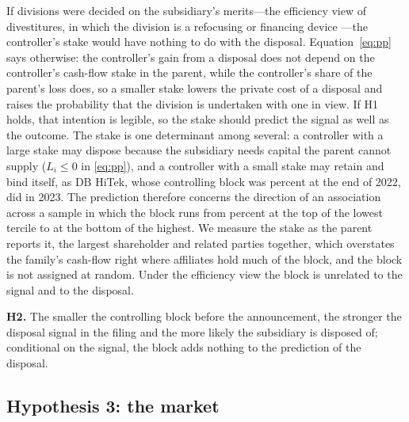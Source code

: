 If divisions were decided on the subsidiary's merits---the efficiency view of divestitures, in which the division is a refocusing or financing device \cite{krishnaswami1999, slovin1995, powers2003, vijh2002}---the controller's stake would have nothing to do with the disposal. Equation~\eqref{eq:pp} says otherwise: the controller's gain from a disposal does not depend on the controller's cash-flow stake in the parent, while the controller's share of the parent's loss does, so a smaller stake lowers the private cost of a disposal and raises the probability that the division is undertaken with one in view. If H1 holds, that intention is legible, so the stake should predict the signal as well as the outcome. The stake is one determinant among several: a controller with a large stake may dispose because the subsidiary needs capital the parent cannot supply ($L_i \le 0$ in \eqref{eq:pp}), and a controller with a small stake may retain and bind itself, as DB HiTek, whose controlling block was \ExDBBlock{} percent at the end of 2022, did in 2023. The prediction therefore concerns the direction of an association across a sample in which the block runs from \LowBlockMax{} percent at the top of the lowest tercile to \HighBlockMin{} at the bottom of the highest. We measure the stake as the parent reports it, the largest shareholder and related parties together, which overstates the family's cash-flow right where affiliates hold much of the block, and the block is not assigned at random. Under the efficiency view the block is unrelated to the signal and to the disposal.

\textbf{H2.} The smaller the controlling block before the announcement, the stronger the disposal signal in the filing and the more likely the subsidiary is disposed of; conditional on the signal, the block adds nothing to the prediction of the disposal.

\subsection{Hypothesis 3: the market}\label{sec:h3}

